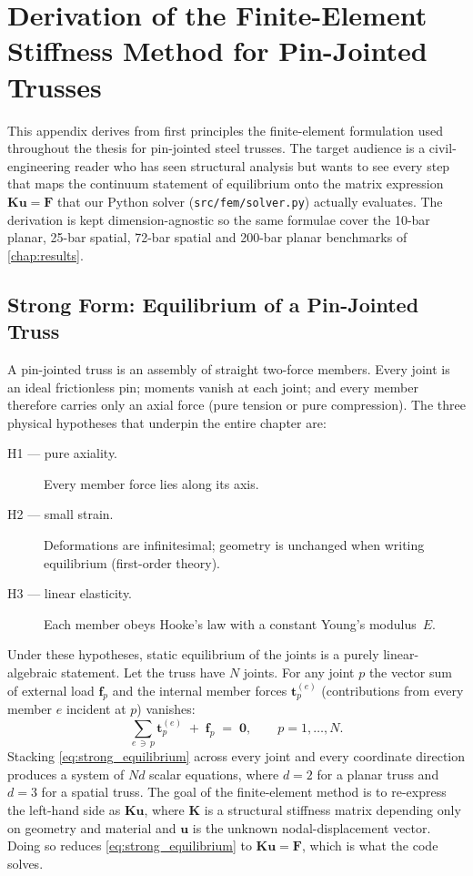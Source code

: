 \chapter{Derivation of the Finite-Element Stiffness Method for Pin-Jointed Trusses}
\label{app:fem}

This appendix derives from first principles the finite-element
formulation used throughout the thesis for pin-jointed steel
trusses. The target audience is a civil-engineering reader who
has seen structural analysis but wants to see every step that
maps the continuum statement of equilibrium onto the matrix
expression $\mathbf{K}\mathbf{u}=\mathbf{F}$ that our Python
solver (\texttt{src/fem/solver.py}) actually evaluates. The
derivation is kept dimension-agnostic so the same formulae cover
the \num{10}-bar planar, \num{25}-bar spatial, \num{72}-bar spatial
and \num{200}-bar planar benchmarks of \cref{chap:results}.

\section{Strong Form: Equilibrium of a Pin-Jointed Truss}
\label{app:fem:strong}

A pin-jointed truss is an assembly of straight two-force members.
Every joint is an ideal frictionless pin; moments vanish at each
joint; and every member therefore carries only an axial force
(pure tension or pure compression). The three physical hypotheses
that underpin the entire chapter are:
\begin{description}
  \item[H1 — pure axiality.] Every member force lies along its axis.
  \item[H2 — small strain.] Deformations are infinitesimal; geometry
    is unchanged when writing equilibrium (first-order theory).
  \item[H3 — linear elasticity.] Each member obeys Hooke's law with
    a constant Young's modulus~$E$.
\end{description}

Under these hypotheses, static equilibrium of the joints is a
purely linear-algebraic statement. Let the truss have $N$ joints.
For any joint $p$ the vector sum of external load $\mathbf{f}_p$
and the internal member forces $\mathbf{t}_p^{(e)}$ (contributions
from every member $e$ incident at $p$) vanishes:
\begin{equation}
  \sum_{e\,\ni\,p}\mathbf{t}_p^{(e)}\;+\;\mathbf{f}_p
  \;=\;\mathbf{0},
  \qquad p=1,\dotsc,N.
  \label{eq:strong_equilibrium}
\end{equation}
Stacking \cref{eq:strong_equilibrium} across every joint and every
coordinate direction produces a system of $Nd$ scalar equations,
where $d=2$ for a planar truss and $d=3$ for a spatial truss. The
goal of the finite-element method is to re-express the left-hand
side as $\mathbf{K}\mathbf{u}$, where $\mathbf{K}$ is a structural
stiffness matrix depending only on geometry and material and
$\mathbf{u}$ is the unknown nodal-displacement vector. Doing so
reduces \cref{eq:strong_equilibrium} to
$\mathbf{K}\mathbf{u}=\mathbf{F}$, which is what the code solves.

